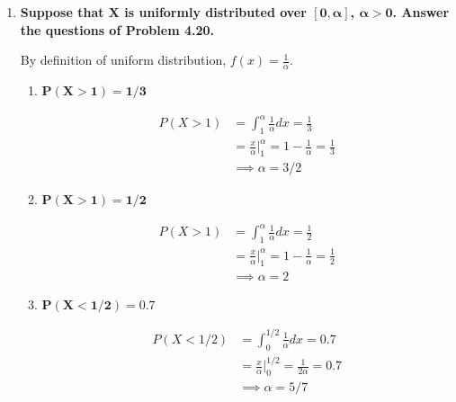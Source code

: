 \documentclass[10pt, oneside]{article}
\begin{document}
\begin{enumerate}[label=4.\arabic*]
\begin{enumerate}
	\end{enumerate}
	
\item  \begin{tcolorbox}[
  colback=Cerulean!5!white,
  colframe=Cerulean!75!black]
\textbf{Suppose that $\bm{X}$ is uniformly distributed over $\bm{[0, \alpha]}$, $\bm{\alpha > 0}$. Answer the questions of Problem 4.20.}
\end{tcolorbox}

	By definition of uniform distribution, $f(x) = \frac{1}{\alpha}$.

	\begin{enumerate}
	\item  \begin{tcolorbox}[
	  colback=Cerulean!5!white,
	  colframe=Cerulean!75!black]
	\textbf{$\bm{P(X > 1) = 1/3}$}
	\end{tcolorbox}
	
	\begin{align*}
	P(X > 1) &= \int^\alpha_1 \frac{1}{\alpha} dx = \frac{1}{3} \\
	&= \frac{x}{\alpha} \Big|^\alpha_1 = 1 - \frac{1}{\alpha} = \frac{1}{3} \\
	&\implies \boxed{\alpha = 3/2}
	\end{align*}
	
	\item  \begin{tcolorbox}[
	  colback=Cerulean!5!white,
	  colframe=Cerulean!75!black]
	\textbf{$\bm{P(X > 1) = 1/2}$}
	\end{tcolorbox}
	
	\begin{align*}
	P(X > 1) &= \int^\alpha_1 \frac{1}{\alpha} dx = \frac{1}{2} \\
	&= \frac{x}{\alpha} \Big|^\alpha_1 = 1 - \frac{1}{\alpha} = \frac{1}{2} \\
	&\implies \boxed{\alpha = 2}
	\end{align*}
	
	\item  \begin{tcolorbox}[
	  colback=Cerulean!5!white,
	  colframe=Cerulean!75!black]
	\textbf{$\bm{P(X < 1/2) = 0.7}$}
	\end{tcolorbox}
	
	\begin{align*}
	P(X < 1/2) &= \int^{1/2}_{0} \frac{1}{\alpha} dx = 0.7 \\
	&= \frac{x}{\alpha} \Big|^{1/2}_{0} = \frac{1}{2\alpha} = 0.7 \\
	&\implies \boxed{\alpha = 5/7}
	\end{align*}
	

\end{enumerate}
\end{enumerate}
\end{document}
